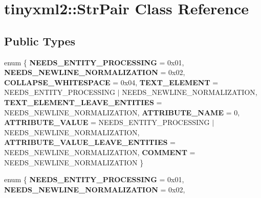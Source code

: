 \hypertarget{classtinyxml2_1_1StrPair}{}\section{tinyxml2\+:\+:Str\+Pair Class Reference}
\label{classtinyxml2_1_1StrPair}
\subsection*{Public Types}
\begin{DoxyCompactItemize}
\item 
\mbox{\label{classtinyxml2_1_1StrPair_af675d58025d24f8d4ee7168ac51b6b8b}} 
enum \{ \newline
{\bfseries N\+E\+E\+D\+S\+\_\+\+E\+N\+T\+I\+T\+Y\+\_\+\+P\+R\+O\+C\+E\+S\+S\+I\+NG} = 0x01, 
{\bfseries N\+E\+E\+D\+S\+\_\+\+N\+E\+W\+L\+I\+N\+E\+\_\+\+N\+O\+R\+M\+A\+L\+I\+Z\+A\+T\+I\+ON} = 0x02, 
{\bfseries C\+O\+L\+L\+A\+P\+S\+E\+\_\+\+W\+H\+I\+T\+E\+S\+P\+A\+CE} = 0x04, 
{\bfseries T\+E\+X\+T\+\_\+\+E\+L\+E\+M\+E\+NT} = N\+E\+E\+D\+S\+\_\+\+E\+N\+T\+I\+T\+Y\+\_\+\+P\+R\+O\+C\+E\+S\+S\+I\+NG $\vert$ N\+E\+E\+D\+S\+\_\+\+N\+E\+W\+L\+I\+N\+E\+\_\+\+N\+O\+R\+M\+A\+L\+I\+Z\+A\+T\+I\+ON, 
\newline
{\bfseries T\+E\+X\+T\+\_\+\+E\+L\+E\+M\+E\+N\+T\+\_\+\+L\+E\+A\+V\+E\+\_\+\+E\+N\+T\+I\+T\+I\+ES} = N\+E\+E\+D\+S\+\_\+\+N\+E\+W\+L\+I\+N\+E\+\_\+\+N\+O\+R\+M\+A\+L\+I\+Z\+A\+T\+I\+ON, 
{\bfseries A\+T\+T\+R\+I\+B\+U\+T\+E\+\_\+\+N\+A\+ME} = 0, 
{\bfseries A\+T\+T\+R\+I\+B\+U\+T\+E\+\_\+\+V\+A\+L\+UE} = N\+E\+E\+D\+S\+\_\+\+E\+N\+T\+I\+T\+Y\+\_\+\+P\+R\+O\+C\+E\+S\+S\+I\+NG $\vert$ N\+E\+E\+D\+S\+\_\+\+N\+E\+W\+L\+I\+N\+E\+\_\+\+N\+O\+R\+M\+A\+L\+I\+Z\+A\+T\+I\+ON, 
{\bfseries A\+T\+T\+R\+I\+B\+U\+T\+E\+\_\+\+V\+A\+L\+U\+E\+\_\+\+L\+E\+A\+V\+E\+\_\+\+E\+N\+T\+I\+T\+I\+ES} = N\+E\+E\+D\+S\+\_\+\+N\+E\+W\+L\+I\+N\+E\+\_\+\+N\+O\+R\+M\+A\+L\+I\+Z\+A\+T\+I\+ON, 
\newline
{\bfseries C\+O\+M\+M\+E\+NT} = N\+E\+E\+D\+S\+\_\+\+N\+E\+W\+L\+I\+N\+E\+\_\+\+N\+O\+R\+M\+A\+L\+I\+Z\+A\+T\+I\+ON
 \}
\item 
\mbox{\label{classtinyxml2_1_1StrPair_a3eca4ec1c6d506cdbdb5d063c4cc06a4}} 
enum \{ \newline
{\bfseries N\+E\+E\+D\+S\+\_\+\+E\+N\+T\+I\+T\+Y\+\_\+\+P\+R\+O\+C\+E\+S\+S\+I\+NG} = 0x01, 
{\bfseries N\+E\+E\+D\+S\+\_\+\+N\+E\+W\+L\+I\+N\+E\+\_\+\+N\+O\+R\+M\+A\+L\+I\+Z\+A\+T\+I\+ON} = 0x02, 

\end{DoxyCompactItemize}

